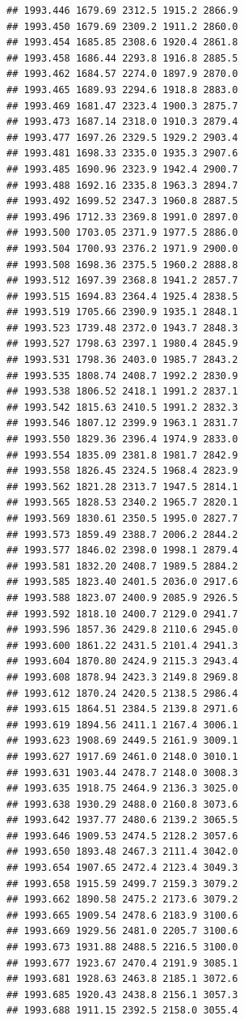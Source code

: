 \documentclass[
]{book}
\begin{document}
\begin{verbatim}
## 1993.446 1679.69 2312.5 1915.2 2866.9
## 1993.450 1679.69 2309.2 1911.2 2860.0
## 1993.454 1685.85 2308.6 1920.4 2861.8
## 1993.458 1686.44 2293.8 1916.8 2885.5
## 1993.462 1684.57 2274.0 1897.9 2870.0
## 1993.465 1689.93 2294.6 1918.8 2883.0
## 1993.469 1681.47 2323.4 1900.3 2875.7
## 1993.473 1687.14 2318.0 1910.3 2879.4
## 1993.477 1697.26 2329.5 1929.2 2903.4
## 1993.481 1698.33 2335.0 1935.3 2907.6
## 1993.485 1690.96 2323.9 1942.4 2900.7
## 1993.488 1692.16 2335.8 1963.3 2894.7
## 1993.492 1699.52 2347.3 1960.8 2887.5
## 1993.496 1712.33 2369.8 1991.0 2897.0
## 1993.500 1703.05 2371.9 1977.5 2886.0
## 1993.504 1700.93 2376.2 1971.9 2900.0
## 1993.508 1698.36 2375.5 1960.2 2888.8
## 1993.512 1697.39 2368.8 1941.2 2857.7
## 1993.515 1694.83 2364.4 1925.4 2838.5
## 1993.519 1705.66 2390.9 1935.1 2848.1
## 1993.523 1739.48 2372.0 1943.7 2848.3
## 1993.527 1798.63 2397.1 1980.4 2845.9
## 1993.531 1798.36 2403.0 1985.7 2843.2
## 1993.535 1808.74 2408.7 1992.2 2830.9
## 1993.538 1806.52 2418.1 1991.2 2837.1
## 1993.542 1815.63 2410.5 1991.2 2832.3
## 1993.546 1807.12 2399.9 1963.1 2831.7
## 1993.550 1829.36 2396.4 1974.9 2833.0
## 1993.554 1835.09 2381.8 1981.7 2842.9
## 1993.558 1826.45 2324.5 1968.4 2823.9
## 1993.562 1821.28 2313.7 1947.5 2814.1
## 1993.565 1828.53 2340.2 1965.7 2820.1
## 1993.569 1830.61 2350.5 1995.0 2827.7
## 1993.573 1859.49 2388.7 2006.2 2844.2
## 1993.577 1846.02 2398.0 1998.1 2879.4
## 1993.581 1832.20 2408.7 1989.5 2884.2
## 1993.585 1823.40 2401.5 2036.0 2917.6
## 1993.588 1823.07 2400.9 2085.9 2926.5
## 1993.592 1818.10 2400.7 2129.0 2941.7
## 1993.596 1857.36 2429.8 2110.6 2945.0
## 1993.600 1861.22 2431.5 2101.4 2941.3
## 1993.604 1870.80 2424.9 2115.3 2943.4
## 1993.608 1878.94 2423.3 2149.8 2969.8
## 1993.612 1870.24 2420.5 2138.5 2986.4
## 1993.615 1864.51 2384.5 2139.8 2971.6
## 1993.619 1894.56 2411.1 2167.4 3006.1
## 1993.623 1908.69 2449.5 2161.9 3009.1
## 1993.627 1917.69 2461.0 2148.0 3010.1
## 1993.631 1903.44 2478.7 2148.0 3008.3
## 1993.635 1918.75 2464.9 2136.3 3025.0
## 1993.638 1930.29 2488.0 2160.8 3073.6
## 1993.642 1937.77 2480.6 2139.2 3065.5
## 1993.646 1909.53 2474.5 2128.2 3057.6
## 1993.650 1893.48 2467.3 2111.4 3042.0
## 1993.654 1907.65 2472.4 2123.4 3049.3
## 1993.658 1915.59 2499.7 2159.3 3079.2
## 1993.662 1890.58 2475.2 2173.6 3079.2
## 1993.665 1909.54 2478.6 2183.9 3100.6
## 1993.669 1929.56 2481.0 2205.7 3100.6
## 1993.673 1931.88 2488.5 2216.5 3100.0
## 1993.677 1923.67 2470.4 2191.9 3085.1
## 1993.681 1928.63 2463.8 2185.1 3072.6
## 1993.685 1920.43 2438.8 2156.1 3057.3
## 1993.688 1911.15 2392.5 2158.0 3055.4

\end{verbatim}
\end{document}
